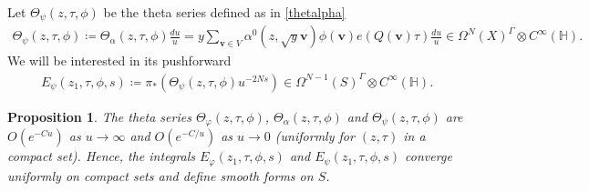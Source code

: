\documentclass[twoside,a4paper,10pt]{article} %
\newcommand{\iotau}{\iota_{u\frac{\partial}{\partial u}}}
\newcommand{\8}{\infty}
\newcommand{\vbf}{\mathbf{v}}
\newcommand{\HH}{\mathbb{H}}
\theoremstyle{mytheoremstyle}
\newtheorem{prop}[thm]{Proposition}
\theoremstyle{remark}
\newtheorem{rmk}{Remark}[section]
\numberwithin{equation}{section}
\begin{document}
Let $\Theta_{\psi}(z,\tau,\phi)$ be the theta series defined as in \eqref{thetalpha}
\begin{align}
\Theta_{\psi}(z,\tau,\phi) \coloneqq \Theta_{\alpha}(z,\tau,\phi)\frac{du}{u}=y\sum_{\vbf \in V} \alpha^0(z,\sqrt{y}\vbf) \phi(\vbf) e(Q(\vbf)\tau)\frac{du}{u} \in \Omega^N(X)^\Gamma \otimes C^\8(\HH).
\end{align}
We will be interested in its pushforward
\begin{align}
E_\psi(z_1,\tau,\phi,s) \coloneqq \pi_\ast \left ( \Theta_{\psi}(z,\tau,\phi)u^{-2Ns} \right ) \in \Omega^{N-1}(S)^\Gamma \otimes C^\8(\HH).
\end{align}
\begin{prop}\label{rapid decrease} The theta series $\Theta_{\varphi}(z,\tau,\phi)$, $\Theta_{\alpha}(z,\tau,\phi)$ and $\Theta_{\psi}(z,\tau,\phi)$ are $O(e^{-Cu})$ as $u \rightarrow \8$ and $O(e^{-C/u})$ as $u \rightarrow 0$ (uniformly for $(z,\tau)$ in a compact set). Hence, the integrals $E_{\varphi}(z_1,\tau,\phi,s)$ and $E_{\psi}(z_1,\tau,\phi,s)$ converge uniformly on compact sets and define smooth forms on $S$.
\end{prop}
\end{document}
